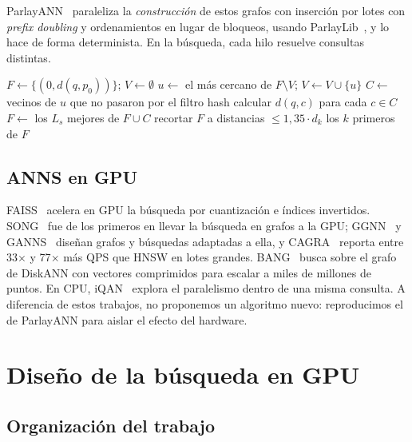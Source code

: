 \documentclass[conference,10pt]{IEEEtran}
\newcommand{\x}{$\times$}
\begin{document}
ParlayANN~\cite{manohar2024parlayann} paraleliza la \emph{construcción} de estos grafos
con inserción por lotes con \emph{prefix doubling} y ordenamientos en lugar de bloqueos,
usando ParlayLib~\cite{blelloch2020parlaylib}, y lo hace de forma determinista. En la
búsqueda, cada hilo resuelve consultas distintas.

\begin{algorithm}[t]
\caption{Beam search de ParlayANN (simplificada)}
\label{alg:beam}
\begin{algorithmic}[1]
\State $F \gets \{(0, d(q,p_0))\}$; $V \gets \emptyset$ 
  \State $u \gets$ el más cercano de $F \setminus V$; $V \gets V \cup \{u\}$
  \State $C \gets$ vecinos de $u$ que no pasaron por el filtro hash
  \State calcular $d(q,c)$ para cada $c \in C$
  \State $F \gets$ los $L_s$ mejores de $F \cup C$ 
  \State recortar $F$ a distancias $\leq 1{,}35 \cdot d_k$
\EndWhile
\State \Return los $k$ primeros de $F$
\end{algorithmic}
\end{algorithm}

\subsection{ANNS en GPU}

FAISS~\cite{johnson2021faiss} acelera en GPU la búsqueda por cuantización e índices
invertidos. SONG~\cite{zhao2020song} fue de los primeros en llevar la búsqueda en grafos
a la GPU; GGNN~\cite{groh2023ggnn} y GANNS~\cite{yu2022ganns} diseñan grafos y búsquedas
adaptadas a ella, y CAGRA~\cite{ootomo2024cagra} reporta entre 33\x{} y 77\x{} más QPS
que HNSW en lotes grandes. BANG~\cite{karthik2024bang} busca sobre el grafo de DiskANN
con vectores comprimidos para escalar a miles de millones de puntos. En CPU,
iQAN~\cite{peng2023iqan} explora el paralelismo dentro de una misma consulta. A
diferencia de estos trabajos, no proponemos un algoritmo nuevo: reproducimos el de
ParlayANN para aislar el efecto del hardware.

\section{Diseño de la búsqueda en GPU}

\subsection{Organización del trabajo}
\end{document}
